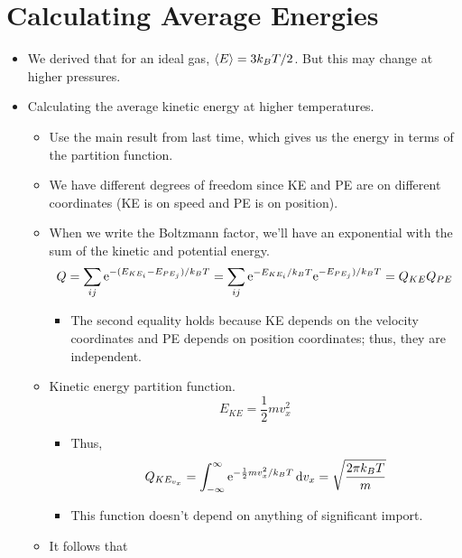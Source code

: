 \documentclass[../notes.tex]{subfiles}
\begin{document}
\section{Calculating Average Energies}
\begin{itemize}
    \item {}We derived that for an ideal gas, $\prb{E}=3k_BT/2$. But this may change at higher pressures.
    \item Calculating the average kinetic energy at higher temperatures.
    \begin{itemize}
        \item Use the main result from last time, which gives us the energy in terms of the partition function.
        \item We have different degrees of freedom since KE and PE are on different coordinates (KE is on speed and PE is on position).
        \item When we write the Boltzmann factor, we'll have an exponential with the sum of the kinetic and potential energy.
        \begin{equation*}
            Q = \sum_{ij}\e[-(E_{KE_i}-E_{PE_j})/k_BT]
            = \sum_{ij}\e[-E_{KE_i}/k_BT]\e[-E_{PE_j})/k_BT]
            = Q_{KE}Q_{PE}
        \end{equation*}
        \begin{itemize}
            \item The second equality holds because KE depends on the velocity coordinates and PE depends on position coordinates; thus, they are independent.
        \end{itemize}
        \item Kinetic energy partition function.
        \begin{equation*}
            E_{KE} = \frac{1}{2}mv_x^2
        \end{equation*}
        \begin{itemize}
            \item Thus,
            \begin{equation*}
                Q_{KE_{v_x}} = \int_{-\infty}^\infty\e[-\frac{1}{2}mv_x^2/k_BT]\dd{v_x} = \sqrt{\frac{2\pi k_BT}{m}}
            \end{equation*}
            \item This function doesn't depend on anything of significant import.
        \end{itemize}
        \item It follows that
        \begin{equation*}

\end{equation*}
\end{itemize}
\end{itemize}
\end{document}
